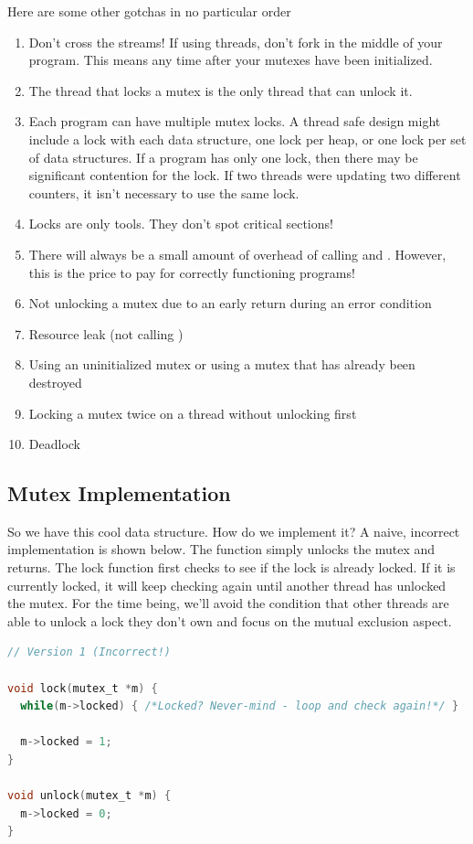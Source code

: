 Here are some other gotchas in no particular order
\begin{enumerate}
\item Don't cross the streams!
If using threads, don't fork in the middle of your program.
This means any time after your mutexes have been initialized.
\item The thread that locks a mutex is the only thread that can unlock it.
\item Each program can have multiple mutex locks.
  A thread safe design might include a lock with each data structure,
  one lock per heap,
  or one lock per set of data structures.
  If a program has only one lock, then there may be significant contention for the lock.
  If two threads were updating two different counters, it isn't necessary to use the same lock.
\item Locks are only tools.
  They don't spot critical sections!
\item There will always be a small amount of overhead of calling  and .
However, this is the price to pay for correctly functioning programs!
\item
  Not unlocking a mutex due to an early return during an error condition
\item
  Resource leak (not calling )
\item
  Using an uninitialized mutex or using a mutex that has already been destroyed
\item
  Locking a mutex twice on a thread without unlocking first
\item
  Deadlock
\end{enumerate}

\subsection{Mutex Implementation}

So we have this cool data structure.
How do we implement it?
A naive, incorrect implementation is shown below.
The  function simply unlocks the mutex and returns.
The lock function first checks to see if the lock is already locked.
If it is currently locked, it will keep checking again until another thread has unlocked the mutex.
For the time being, we'll avoid the condition that other threads are able to unlock a lock they don't own and focus on the mutual exclusion aspect.

\begin{lstlisting}[language=C]
// Version 1 (Incorrect!)

void lock(mutex_t *m) {
  while(m->locked) { /*Locked? Never-mind - loop and check again!*/ }

  m->locked = 1;
}

void unlock(mutex_t *m) {
  m->locked = 0;
}
\end{lstlisting}

